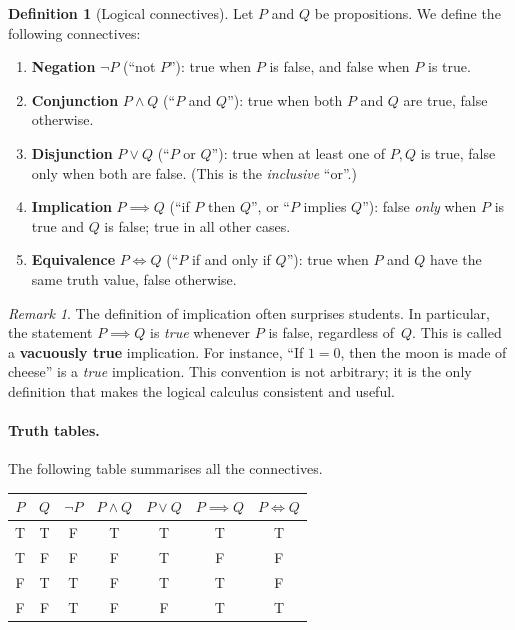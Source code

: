 \documentclass[12pt,a4paper,openany]{book}
\theoremstyle{definition}
\newtheorem{definition}{Definition}[chapter]
\theoremstyle{remark}
\newtheorem{remark}{Remark}[chapter]
\begin{document}
\begin{definition}[Logical connectives]\label{def:connectives}
Let $P$ and $Q$ be propositions.  We define the following connectives:
\begin{enumerate}[label=(\roman*)]
  \item \textbf{Negation} $\neg P$ (``not $P$''): true when
    $P$ is false, and false when $P$ is true.
  \item \textbf{Conjunction} $P \land Q$ (``$P$ and
    $Q$''): true when both $P$ and $Q$ are true, false otherwise.
  \item \textbf{Disjunction} $P \lor Q$ (``$P$ or
    $Q$''): true when at least one of $P,Q$ is true, false only when both
    are false.  (This is the \emph{inclusive} ``or''.)
  \item \textbf{Implication} $P \implies Q$ (``if $P$
    then $Q$'', or ``$P$ implies $Q$''): false \emph{only} when $P$ is true
    and $Q$ is false; true in all other cases.
  \item \textbf{Equivalence} $P \iff Q$ (``$P$ if and
    only if $Q$''): true when $P$ and $Q$ have the same truth value, false
    otherwise.
\end{enumerate}
\end{definition}

\begin{remark}\label{rem:implication-vacuous}
The definition of implication often surprises students.  In particular, the
statement $P \implies Q$ is \emph{true} whenever $P$ is false, regardless
of~$Q$.  This is called a \textbf{vacuously true}
implication.  For instance, ``If $1=0$, then the moon is made of cheese'' is
a \emph{true} implication.  This convention is not arbitrary; it is the only
definition that makes the logical calculus consistent and useful.
\end{remark}

\paragraph{Truth tables.}
The following table summarises all the connectives.

\medskip
\begin{center}
\begin{tabular}{cc|ccccc}
\toprule
$P$ & $Q$ & $\neg P$ & $P\land Q$ & $P\lor Q$ & $P\implies Q$ & $P\iff Q$\\
\midrule
T & T & F & T & T & T & T \\
T & F & F & F & T & F & F \\
F & T & T & F & T & T & F \\
F & F & T & F & F & T & T \\
\bottomrule
\end{tabular}
\end{center}
\end{document}
